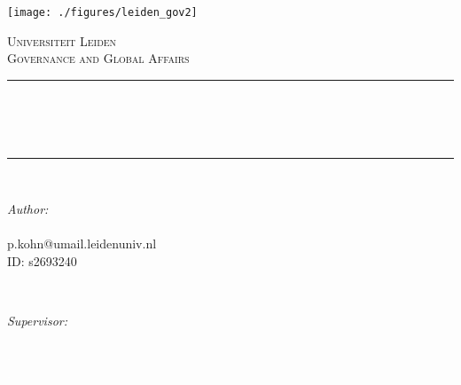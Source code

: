 \begin{titlepage}

\newcommand{\HRule}{\rule{\linewidth}{0.25mm}} %



\texttt{[image: ./figures/leiden\_gov2]}\\[0.5cm] 

\center %


\textsc{\Large Universiteit Leiden}\\[0.5cm] 
\textsc{\large Governance and Global Affairs}\\[0.5cm] 


\HRule \\[0.4cm]
{ \huge \bfseries \reporttitle}\\[0.5cm] 
{\it \reportsubtitle}\\
\HRule \\[1.5cm]
 

\begin{minipage}{0.4\textwidth}
\begin{flushleft} \large
\emph{Author:}\\
\reportauthor \\%
\small
p.kohn@umail.leidenuniv.nl\\
ID: s2693240
\end{flushleft}
\end{minipage}
~
\begin{minipage}{0.4\textwidth}
\begin{flushright} \large
\emph{Supervisor:} \\
\supervisor \\
\small
\textcolor{white}{.}\\ 
\textcolor{white}{.}\\ %
\end{flushright}
\end{minipage}\\[4cm]


\end{titlepage}
